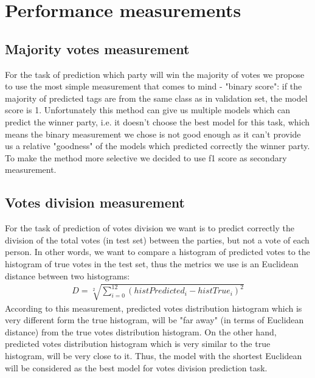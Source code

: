 \documentclass[12pt]{article}
\begin{document}
\newpage
\section{Performance measurements}
\subsection{Majority votes measurement}
For the task of prediction which party will win the majority of votes we propose to use the most simple measurement that comes to mind - "binary score": if the majority of predicted tags are from the same class as in validation set, the model score is 1. Unfortunately this method can give us multiple models which can predict the winner party, i.e. it doesn't choose the best model for this task, which means the binary measurement we chose is not good enough as it can't provide us a relative "goodness" of the models which predicted correctly the winner party. To make the method more selective we decided to use f1 score as secondary measurement.

\subsection{Votes division measurement}
For the task of prediction of votes division we want is to predict correctly the division of the total votes (in test set) between the parties, but not a vote of each person. In other words, we want to compare a histogram of predicted votes to the histogram of true votes in the test set, thus the metrics we use is an Euclidean distance between two histograms:
\begin{gather*}
D = \sqrt[2]{\sum_{i=0}^{12} (histPredicted_i - histTrue_i)^2}   
\end{gather*}
According to this measurement, predicted votes distribution histogram which is very different form the true histogram, will be "far away" (in terms of Euclidean distance) from the true votes distribution histogram. On the other hand, predicted votes distribution histogram which is very similar to the true histogram, will be very close to it. Thus, the model with the shortest Euclidean will be considered as the best model for votes division prediction task.
\end{document}
